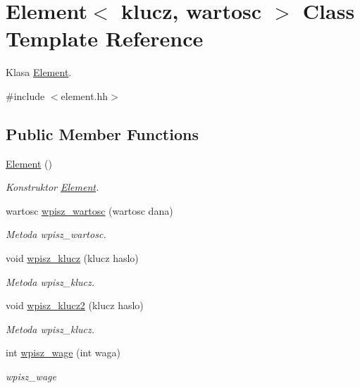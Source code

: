 \hypertarget{class_element}{\section{Element$<$ klucz, wartosc $>$ Class Template Reference}
\label{class_element}
}


Klasa \hyperlink{class_element}{Element}.  




{\ttfamily \#include $<$element.\+hh$>$}

\subsection*{Public Member Functions}
\begin{DoxyCompactItemize}
\item 
\hyperlink{class_element_a2908ce7965da27acf29ba7a8ed702a9e}{Element} ()
\begin{DoxyCompactList}\small\item\em Konstruktor \hyperlink{class_element}{Element}. \end{DoxyCompactList}\item 
wartosc \hyperlink{class_element_a9e53cf7a1b06c07beabd972d31d2d9f9}{wpisz\+\_\+wartosc} (wartosc dana)
\begin{DoxyCompactList}\small\item\em Metoda wpisz\+\_\+wartosc. \end{DoxyCompactList}\item 
void \hyperlink{class_element_aab83ecbc43e50357b34839a7836f7f00}{wpisz\+\_\+klucz} (klucz haslo)
\begin{DoxyCompactList}\small\item\em Metoda wpisz\+\_\+klucz. \end{DoxyCompactList}\item 
void \hyperlink{class_element_aea3e8d9929eaf9921ba3e805ccae9d3c}{wpisz\+\_\+klucz2} (klucz haslo)
\begin{DoxyCompactList}\small\item\em Metoda wpisz\+\_\+klucz. \end{DoxyCompactList}\item 
int \hyperlink{class_element_afb6bb7f1f9c6a127b66bd8a49f83f1dc}{wpisz\+\_\+wage} (int waga)
\begin{DoxyCompactList}\small\item\em wpisz\+\_\+wage \end{DoxyCompactList}\item 

\end{DoxyCompactItemize}
